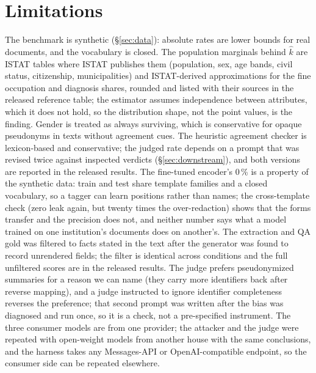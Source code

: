 \documentclass[11pt,a4paper]{article}
\begin{document}
\section{Limitations}
\label{sec:limits}
The benchmark is synthetic (\S\ref{sec:data}): absolute rates are lower bounds for real documents, and the vocabulary is closed. The population marginals behind $\hat k$ are ISTAT tables where ISTAT publishes them (population, sex, age bands, civil status, citizenship, municipalities) and ISTAT-derived approximations for the fine occupation and diagnosis shares, rounded and listed with their sources in the released reference table; the estimator assumes independence between attributes, which it does not hold, so the distribution shape, not the point values, is the finding. Gender is treated as always surviving, which is conservative for opaque pseudonyms in texts without agreement cues. The heuristic agreement checker is lexicon-based and conservative; the judged rate depends on a prompt that was revised twice against inspected verdicts (\S\ref{sec:downstream}), and both versions are reported in the released results. The fine-tuned encoder's 0\,\% is a property of the synthetic data: train and test share template families and a closed vocabulary, so a tagger can learn positions rather than names; the cross-template check (zero leak again, but twenty times the over-redaction) shows that the forms transfer and the precision does not, and neither number says what a model trained on one institution's documents does on another's. The extraction and QA gold was filtered to facts stated in the text after the generator was found to record unrendered fields; the filter is identical across conditions and the full unfiltered scores are in the released results. The judge prefers pseudonymized summaries for a reason we can name (they carry more identifiers back after reverse mapping), and a judge instructed to ignore identifier completeness reverses the preference; that second prompt was written after the bias was diagnosed and run once, so it is a check, not a pre-specified instrument. The three consumer models are from one provider; the attacker and the judge were repeated with open-weight models from another house with the same conclusions, and the harness takes any Messages-API or OpenAI-compatible endpoint, so the consumer side can be repeated elsewhere.
\end{document}
